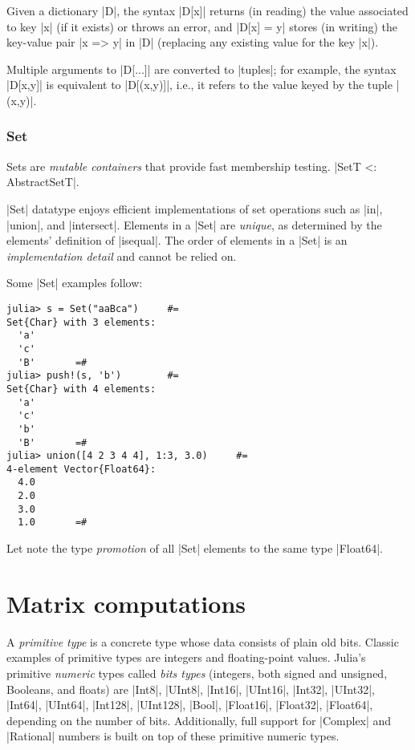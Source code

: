 Given a dictionary |D|, the syntax |D[x]| returns (in reading) the value associated to key |x| (if it exists) or throws an error, and |D[x] = y| stores (in writing) the key-value pair |x => y| in |D| ({replacing} any existing value for the key |x|). 

Multiple arguments to |D[...]| are converted to |tuples|; for example, the syntax |D[x,y]| is equivalent to |D[(x,y)]|, i.e., it refers to the value keyed by the tuple |(x,y)|.


\subsubsection*{Set}

\begin{definition}
Sets are \emph{mutable containers} that provide fast membership testing. |Set{T} <: AbstractSet{T}|.
\end{definition}


|Set| datatype enjoys efficient implementations of set operations such as |in|, |union|, and |intersect|. Elements in a |Set| are \emph{unique}, as determined by the elements' definition of |isequal|. The order of elements in a |Set| is an \emph{implementation detail} and cannot be relied on.

\begin{coding} Some |Set| examples follow:
\begin{lstlisting}[language=JuliaLocal, style=julia, mathescape=false]
julia> s = Set("aaBca")		#=
Set{Char} with 3 elements:
  'a'
  'c'
  'B'		=#
julia> push!(s, 'b')		#=
Set{Char} with 4 elements:
  'a'
  'c'
  'b'
  'B'		=#
julia> union([4 2 3 4 4], 1:3, 3.0)		#=
4-element Vector{Float64}:
  4.0
  2.0
  3.0
  1.0		=#
\end{lstlisting}
Let note the type \emph{promotion} of all |Set| elements to the same type |Float64|.
\end{coding}



\section{Matrix computations}\label{sect:1-3}


A \emph{primitive type} is a concrete type whose data consists of plain old bits. Classic examples of primitive types are integers and floating-point values. 
Julia's primitive \emph{numeric} types called \emph{bits types} (integers, both signed and unsigned, Booleans, and floats) are |Int8|, |UInt8|, |Int16|, |UInt16|, |Int32|, |UInt32|, |Int64|, |UInt64|, |Int128|, |UInt128|, |Bool|, |Float16|, |Float32|, |Float64|, depending on the number of bits. Additionally, full support for |Complex| and |Rational| numbers is built on top of these primitive numeric types.

